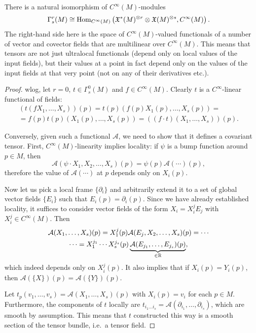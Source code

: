 \begin{thm}\label{thm tensor characterization}
    There is a natural isomorphism of $C^\infty (M)$-modules
    \[
    \Gamma^r_s(M)\cong \operatorname{Hom}_{C^\infty(M)}\left( \mathfrak{X}^\ast(M)^{\otimes r}\otimes \mathfrak{X}(M)^{\otimes s},C^\infty(M)\right).
    \]
    The right-hand side here is the space of $C^\infty(M)$-valued functionals of a number of vector and covector fields that are multilinear over $C^\infty(M)$. This means that tensors are not just ultralocal functionals (depend only on local values of the input fields), but their values at a point in fact depend only on the values of the input fields at that very point (not on any of their derivatives etc.).
\end{thm}
\begin{proof}
    \gls{wlog}, let $r=0$, $t\in \Gamma^0_s(M)$ and $f\in C^\infty (M)$. Clearly $t$ is a $C^\infty$-linear functional of fields:
    \begin{multline}
         (t(fX_1,\ldots,X_s))(p)=t(p)(f(p)X_1(p),\ldots,X_s(p))=\\=f(p)t(p)(X_1(p),\ldots,X_s(p))=((f\cdot t)(X_1,\ldots,X_s))(p).
    \end{multline}

    Conversely, given such a functional $\mathcal{A}$, we need to show that it defines a covariant tensor. First, $C^\infty(M)$-linearity implies locality: if $\psi$ is a bump function around $p\in M$, then \[\mathcal{A}(\psi\cdot X_1,X_2,\ldots, X_s)(p)=\psi(p)\mathcal{A}(\cdots)(p),\] therefore the value of $\mathcal{A}(\cdots)$ at $p$ depends only on $X_i(p)$.

    Now let us pick a local frame $\{\partial_i\}$ and arbitrarily extend it to a set of global vector fields $\{E_i\}$ such that $E_i(p)=\partial_i(p)$. Since we have already established locality, it suffices to consider vector fields of the form $X_i=X^j_i E_j$ with $X^j_i\in C^\infty(M)$. Then
    \begin{multline}
        \mathcal{A}(X_1,\ldots,X_s)(p)=X^j_1(p)\mathcal{A}(E_j,X_2,\ldots,X_s)(p)=\cdots\\ \cdots=X_1^{j_1}\cdots X_s^{j_s}(p)\underbrace{\mathcal{A}(E_{j_1},\ldots,E_{j_s})(p)}_{\in\mathbb{R} },
    \end{multline}
    which indeed depends only on $X_i^j(p)$. It also implies that if $X_i(p)=Y_i(p)$, then $\mathcal{A}(\{X\})(p)=\mathcal{A}(\{Y\})(p)$.

    Let $t_p (v_1,\ldots,v_s)=\mathcal{A}(X_1,\ldots,X_s)(p)$ with $X_i(p)=v_i$ for each $p\in M$. Furthermore, the components of $t$ locally are $t_{i_1\ldots i_s}=\mathcal{A}(\partial_{i_1},\ldots,\partial_{i_s})$, which are smooth by assumption. This means that $t$ constructed this way is a smooth section of the tensor bundle, i.e.\ a tensor field.
\end{proof}


